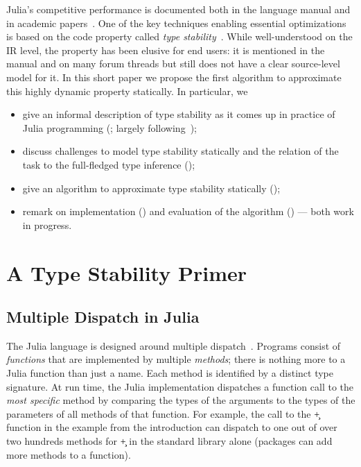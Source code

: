 \documentclass[sigplan,screen]{acmart}
\begin{document}
Julia's competitive performance is documented both in the language manual and in
academic papers~\cite{oopsla18a}. One of the key techniques enabling
essential optimizations is based on the code property called \emph{type
stability}~\cite{Pelenitsyn21}. While well-understood on the IR level, the
property has been elusive for end users: it is mentioned in the manual and on
many forum threads but still does not have a clear source-level model for it.
In this short paper we propose the first algorithm to approximate this highly
dynamic property statically. In particular, we
\begin{itemize}

  \item give an informal description of type stability as it comes up in
  practice of Julia programming (; largely following~\cite{Pelenitsyn21});

  \item discuss challenges to model type stability statically and the relation
  of the task to the full-fledged type inference ();

  \item give an algorithm to approximate type stability statically ();

  \item remark on implementation () and
  evaluation of the algorithm () --- both work in progress.
\end{itemize}

\section{A Type Stability Primer}%
\label{sec:back}

\subsection{Multiple Dispatch in Julia}%

The Julia language is designed around multiple dispatch~\cite{BezansonEKS17}.
Programs consist of \emph{functions} that are implemented by multiple
\emph{methods}; there is nothing more to a Julia function than just a name. Each
method is identified by a distinct type signature. At run time, the Julia
implementation dispatches a function call to the \emph{most specific} method by
comparing the types of the arguments to the types of the parameters of all
methods of that function. For example, the call to the \c{+} function in the
example from the introduction can dispatch to one out of over two hundreds
methods for \c{+} in the standard library alone (packages can add more methods
to a function). %
\end{document}
